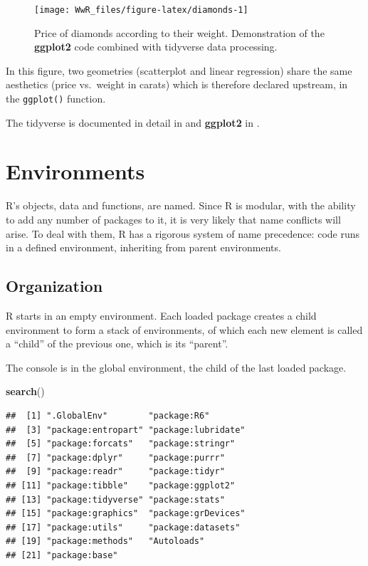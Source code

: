 \documentclass[
  12pt,
  american,
  a4paper,
  extrafontsizes,onecolumn,openright
  ]{memoir}
\newenvironment{Shaded}{\begin{snugshade}}{\end{snugshade}}
\newcommand{\FunctionTok}[1]{\textcolor[rgb]{0.13,0.29,0.53}{\textbf{#1}}}
\newcommand{\NormalTok}[1]{#1}
\begin{document}
\begin{figure}

{\centering \texttt{[image: WwR\_files/figure-latex/diamonds-1]} 

}

\caption{Price of diamonds according to their weight. Demonstration of the \textbf{ggplot2} code combined with tidyverse data processing.}\label{fig:diamonds}
\end{figure}

\normalsize

In this figure, two geometries (scatterplot and linear regression) share the same aesthetics (price vs.~weight in carats) which is therefore declared upstream, in the \texttt{ggplot()} function.

The tidyverse is documented in detail in \textcite{Wickham2016} and \textbf{ggplot2} in \textcite{Wickham2017}.

\section{Environments}\label{sec:environnements}

R's objects, data and functions, are named.
Since R is modular, with the ability to add any number of packages to it, it is very likely that name conflicts will arise.
To deal with them, R has a rigorous system of name precedence: code runs in a defined environment, inheriting from parent environments.

\subsection{Organization}\label{organization}

R starts in an empty environment.
Each loaded package creates a child environment to form a stack of environments, of which each new element is called a \enquote{child} of the previous one, which is its \enquote{parent}.

The console is in the global environment, the child of the last loaded package.

\scriptsize

\begin{Shaded}
\begin{Highlighting}[]
\FunctionTok{search}\NormalTok{()}
\end{Highlighting}
\end{Shaded}

\begin{verbatim}
##  [1] ".GlobalEnv"        "package:R6"       
##  [3] "package:entropart" "package:lubridate"
##  [5] "package:forcats"   "package:stringr"  
##  [7] "package:dplyr"     "package:purrr"    
##  [9] "package:readr"     "package:tidyr"    
## [11] "package:tibble"    "package:ggplot2"  
## [13] "package:tidyverse" "package:stats"    
## [15] "package:graphics"  "package:grDevices"
## [17] "package:utils"     "package:datasets" 
## [19] "package:methods"   "Autoloads"        
## [21] "package:base"
\end{verbatim}
\end{document}

